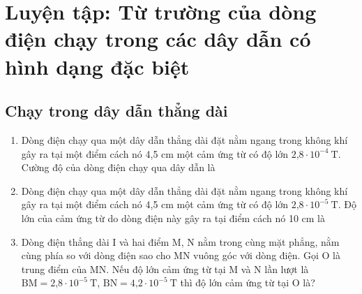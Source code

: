 \chapter{Luyện tập: Từ trường của dòng điện chạy trong các dây dẫn có hình dạng đặc biệt}
\section{Chạy trong dây dẫn thẳng dài}
\begin{enumerate}
	\item {Dòng điện chạy qua một dây dẫn thẳng dài đặt nằm ngang trong không khí gây ra tại một điểm cách nó 4,5 cm một cảm ứng từ có độ lớn $\text{2,8}\cdot 10^{-4}\ \text{T}$. Cường độ của dòng điện chạy qua dây dẫn là 
	}
	\item {Dòng điện chạy qua một dây dẫn thẳng dài đặt nằm ngang trong không khí gây ra tại một điểm cách nó 4,5 cm một cảm ứng từ có độ lớn $\text{2,8}\cdot 10^{-5}\ \text{T}$. Độ lớn của cảm ứng từ do dòng điện này gây ra tại điểm cách nó 10 cm là
	}
	\item {Dòng điện thẳng dài I và hai điểm M, N nằm trong cùng mặt phẳng, nằm cùng phía so với dòng điện sao cho MN vuông góc với dòng điện. Gọi O là trung điểm của MN. Nếu độ lớn cảm ứng từ tại M và N lần lượt là $\text{BM}=\text{2,8}\cdot 10^{-5}\ \text{T}$, $\text{BN}=\text{4,2}\cdot 10^{-5}\ \text{T}$ thì độ lớn cảm ứng từ tại O là?
	}
\end{enumerate}

